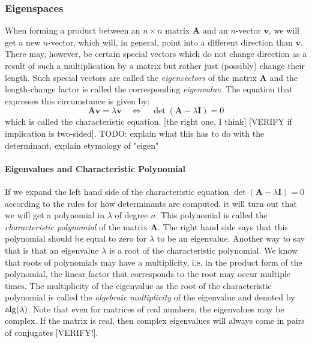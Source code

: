 
% 





\subsubsection{Eigenspaces}
When forming a product between an $n \times n$ matrix $\mathbf{A}$ and an $n$-vector $\mathbf{v}$, we will get a new $n$-vector, which will, in general, point into a different direction than  $\mathbf{v}$. There may, however, be certain special vectors which do not change direction as a result of such a multiplication by a matrix but rather just (possibly) change their length. Such special vectors are called the \emph{eigenvectors} of the matrix $\mathbf{A}$ and the length-change factor is called the corresponding \emph{eigenvalue}. The equation that expresses this circumstance is given by:
\begin{equation}
 \mathbf{A v} = \lambda \mathbf{v}  
 \quad \Leftrightarrow \quad
 \det ( \mathbf{A} - \lambda \mathbf{I} ) = 0
\end{equation}
which is called the characteristic equation. [the right one, I think]
[VERIFY if implication is two-sided]. TODO: explain what this has to do with the determinant, explain etymology of "eigen"


\paragraph{Eigenvalues and Characteristic Polynomial}
If we expand the left hand side of the characteristic equation $\det ( \mathbf{A} - \lambda \mathbf{I} ) = 0$ according to the rules for how determinants are computed, it will turn out that we will get a polynomial in $\lambda$ of degree $n$. This polynomial is called the \emph{characteristic polynomial} of the matrix  $\mathbf{A}$. The right hand side says that this polynomial should be equal to zero for $\lambda$ to be an eigenvalue. Another way to say that is that an eigenvalue $\lambda$ is a root of the characteristic polynomial. We know that roots of polynomials may have a multiplicity, i.e. in the product form of the polynomial, the linear factor that corresponds to the root may occur multiple times. The multiplicity of the eigenvalue as the root of the characteristic polynomial is called the \emph{algebraic multiplicity} of the eigenvalue and denoted by $\operatorname{alg}(\lambda)$. Note that even for matrices of real numbers, the eigenvalues may be complex. If the matrix is real, then complex eigenvalues will always come in pairs of conjugates [VERIFY!].

